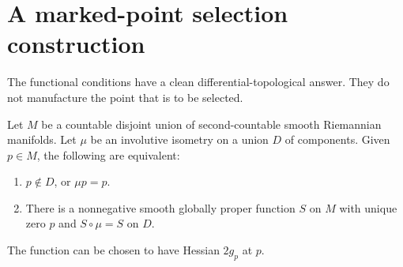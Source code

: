 \section{A marked-point selection construction}
The functional conditions have a clean differential-topological answer.
They do not manufacture the point that is to be selected.

\begin{theorem}\label{thm:selection}
Let $M$ be a countable disjoint union of second-countable smooth
Riemannian manifolds. Let $\mu$ be an involutive isometry on a union $D$
of components. Given $p\in M$, the following are equivalent:
\begin{enumerate}[label=(\roman*)]
\item $p\notin D$, or $\mu p=p$.
\item There is a nonnegative smooth globally proper function $S$ on $M$
with unique zero $p$ and $S\circ\mu=S$ on $D$.
\end{enumerate}
The function can be chosen to have Hessian $2g_p$ at $p$.
\end{theorem}
